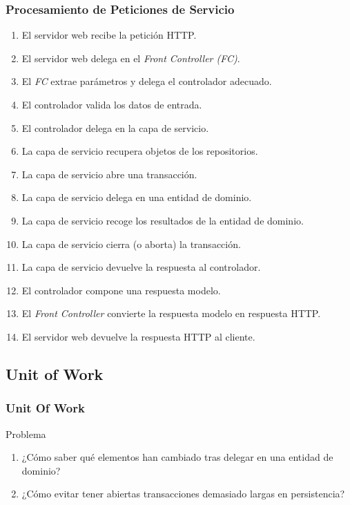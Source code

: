 \documentclass[a4paper,slidestop,xcolor=pst,blue]{beamer}
\begin{document}
\begin{frame}[c]
    \frametitle{Procesamiento de Peticiones de Servicio}
    \begin{enumerate}[<+->]
        \item El servidor web recibe la petición HTTP. 
        \item El servidor web delega en el \emph{Front Controller (FC)}. 
        \item El \emph{FC} extrae parámetros y delega el controlador adecuado.
        \item El controlador valida los datos de entrada.
        \item El controlador delega en la capa de servicio.
        \item La capa de servicio recupera objetos de los repositorios.
        \item La capa de servicio abre una transacción.
        \item La capa de servicio delega en una entidad de dominio.
        \item La capa de servicio recoge los resultados de la entidad de dominio.
        \item La capa de servicio cierra (o aborta) la transacción.
        \item La capa de servicio devuelve la respuesta al controlador.
        \item El controlador compone una respuesta modelo.
        \item El \emph{Front Controller} convierte la respuesta modelo en respuesta HTTP.
        \item El servidor web devuelve la respuesta HTTP al cliente.  
    \end{enumerate}
\end{frame}

\subsection{Unit of Work}

\begin{frame}[c]
    \frametitle{Unit Of Work}
    \begin{block}{Problema}
        \begin{enumerate}
            \item<1-> ¿Cómo saber qué elementos han cambiado tras delegar en una entidad de dominio?
            \item<2-> ¿Cómo evitar tener abiertas transacciones demasiado largas en persistencia?
        \end{enumerate}
    \end{block}
\end{frame}
\end{document}

